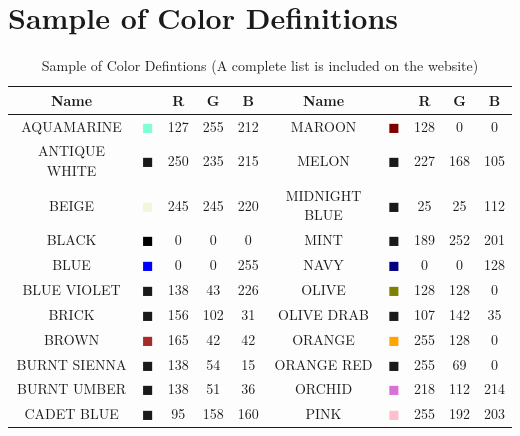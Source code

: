 \documentclass[11pt]{book}
\begin{document}
\section{Sample of Color Definitions}%
\begin{table}[H]
\begin{center}
\caption{Sample of Color Defintions (A complete list is included on the website) }
\label{tab:colors}
\vspace{0.1in}
\begin{tabular}{|c|c|c|c|c|c||c|c|c|c|}
\hline
Name & &  R  & G & B & Name & & R & G & B   \\ \hline \hline
{\ct AQUAMARINE} & \textcolor{AQUAMARINE} {$\blacksquare$} & 127& 255& 212& {\ct MAROON} &  \textcolor{MAROON} {$\blacksquare$} & 128& 0& 0  \\ \hline
{\ct ANTIQUE WHITE} & \textcolor{ANTIQUE WHITE} {$\blacksquare$} & 250& 235& 215& {\ct MELON} &  \textcolor{MELON} {$\blacksquare$} & 227& 168& 105  \\ \hline
{\ct BEIGE} & \textcolor{BEIGE} {$\blacksquare$} & 245& 245& 220& {\ct MIDNIGHT BLUE} &  \textcolor{MIDNIGHT BLUE} {$\blacksquare$} & 25& 25& 112  \\ \hline
{\ct BLACK} & \textcolor{BLACK} {$\blacksquare$} & 0& 0& 0& {\ct MINT} &  \textcolor{MINT} {$\blacksquare$} & 189& 252& 201  \\ \hline
{\ct BLUE} & \textcolor{BLUE} {$\blacksquare$} & 0& 0& 255& {\ct NAVY} &  \textcolor{NAVY} {$\blacksquare$} & 0& 0& 128  \\ \hline
{\ct BLUE VIOLET} & \textcolor{BLUE VIOLET} {$\blacksquare$} & 138& 43& 226& {\ct OLIVE} &  \textcolor{OLIVE} {$\blacksquare$} & 128& 128& 0  \\ \hline
{\ct BRICK} & \textcolor{BRICK} {$\blacksquare$} & 156& 102& 31& {\ct OLIVE DRAB} &  \textcolor{OLIVE DRAB} {$\blacksquare$} & 107& 142& 35  \\ \hline
{\ct BROWN} & \textcolor{BROWN} {$\blacksquare$} & 165& 42& 42& {\ct ORANGE} &  \textcolor{ORANGE} {$\blacksquare$} & 255& 128& 0  \\ \hline
{\ct BURNT SIENNA} & \textcolor{BURNT SIENNA} {$\blacksquare$} & 138& 54& 15& {\ct ORANGE RED} &  \textcolor{ORANGE RED} {$\blacksquare$} & 255& 69& 0  \\ \hline
{\ct BURNT UMBER} & \textcolor{BURNT UMBER} {$\blacksquare$} & 138& 51& 36& {\ct ORCHID} &  \textcolor{ORCHID} {$\blacksquare$} & 218& 112& 214  \\ \hline
{\ct CADET BLUE} & \textcolor{CADET BLUE} {$\blacksquare$} & 95& 158& 160& {\ct PINK} &  \textcolor{PINK} {$\blacksquare$} & 255& 192& 203  \\ \hline

\end{tabular}
\end{center}
\end{table}
\end{document}
